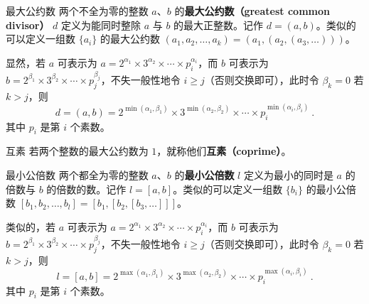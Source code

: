 
\begin{definition}{最大公约数}
两个不全为零的整数 $a$、$b$ 的\textbf{最大公约数（greatest common divisor）} $d$ 定义为能同时整除 $a$ 与 $b$ 的最大正整数。记作 $d = (a, b)$。类似的可以定义一组数 $\{a_i\}$ 的最大公约数 $(a_1, a_2, \dots, a_k) = (a_1, (a_2, (a_3, \dots)))$。
\end{definition}
显然，若 $a$ 可表示为 $a = 2^{\alpha_1} \times 3^{\alpha_2} \times \cdots \times p_i^{\alpha_i}$，而 $b$ 可表示为 $b = 2^{\beta_1} \times 3^{\beta_2} \times \cdots \times p_j^{\beta_j}$，不失一般性地令 $i \ge j$（否则交换即可），此时令 $\beta_k = 0$ 若 $k > j$，则
\begin{equation}
d = (a, b) = 2^{\min(\alpha_1, \beta_1)} \times 3^{\min(\alpha_2, \beta_2)} \times \cdots \times p_i^{\min(\alpha_i, \beta_i)} ~.
\end{equation}
其中 $p_i$ 是第 $i$ 个素数。

\begin{definition}{互素}
若两个整数的最大公约数为 $1$，就称他们\textbf{互素（coprime）}。
\end{definition}

\begin{definition}{最小公倍数}
两个都全为零的整数 $a$、$b$ 的\textbf{最小公倍数} $l$ 定义为最小的同时是 $a$ 的倍数与 $b$ 的倍数的数。记作 $l = [a, b]$。类似的可以定义一组数 $\{b_i\}$ 的最小公倍数 $[b_1, b_2, \dots, b_l] = [b_1, [b_2, [b_3, \dots]]]$。
\end{definition}
类似的，若 $a$ 可表示为 $a = 2^{\alpha_1} \times 3^{\alpha_2} \times \cdots \times p_i^{\alpha_i}$，而 $b$ 可表示为 $b = 2^{\beta_1} \times 3^{\beta_2} \times \cdots \times p_j^{\beta_j}$，不失一般性地令 $i \ge j$（否则交换即可），此时令 $\beta_k = 0$ 若 $k > j$，则
\begin{equation}
l = [a, b] = 2^{\max(\alpha_1, \beta_1)} \times 3^{\max(\alpha_2, \beta_2)} \times \cdots \times p_i^{\max(\alpha_i, \beta_i)} ~.
\end{equation}
其中 $p_i$ 是第 $i$ 个素数。

